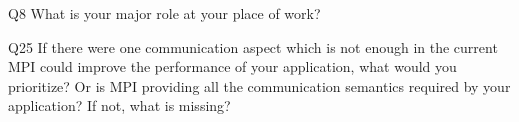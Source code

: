 \begin{description}%
\item{Q8} What is your major role at your place of work?%
\item{Q25} If there were one communication aspect which is not enough in the current MPI could improve the performance of your application, what would you prioritize? Or is MPI providing all the communication semantics required by your application? If not, what is missing?%
\end{description}%
